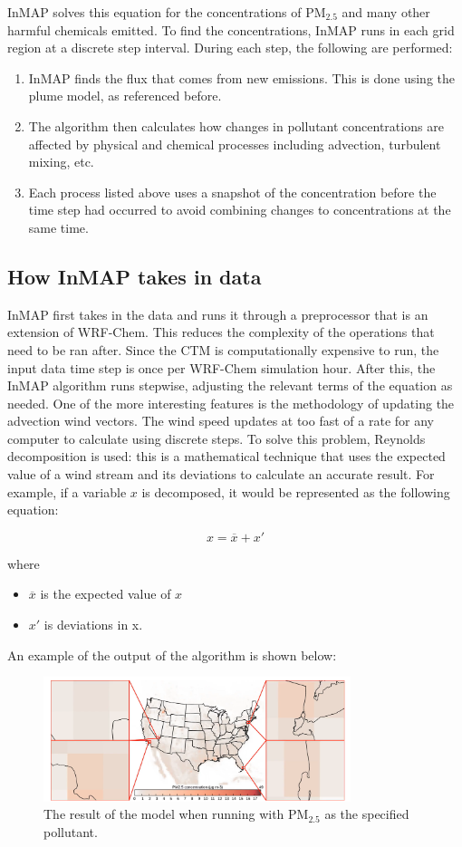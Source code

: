 \documentclass{article}
\begin{document}
InMAP solves this equation for the concentrations of $\text{PM}_{2.5}$ and many other harmful chemicals emitted. To find the concentrations,
InMAP runs in each grid region at a discrete step interval. During each step, the following are performed: 

\begin{enumerate}
    \item InMAP finds the flux that comes from new emissions. This is done using the plume model, as referenced before. 
    \item The algorithm then calculates how changes in pollutant concentrations are affected by physical and chemical processes including advection, turbulent mixing, etc.
    \item Each process listed above uses a snapshot of the concentration before the time step had occurred to avoid combining changes to concentrations at the same time. 
  \end{enumerate} 

\subsection{How InMAP takes in data}

InMAP first takes in the data and runs it through a preprocessor that is an extension of WRF-Chem. This reduces the complexity of the operations
that need to be ran after. Since the CTM is computationally expensive to run, the input data time step is once per WRF-Chem simulation hour. 
After this, the InMAP algorithm runs stepwise, adjusting the relevant terms of the equation as needed. One of the more interesting features is the 
methodology of updating the advection wind vectors. The wind speed updates at too fast of a rate for any computer to calculate using discrete steps.
To solve this problem, Reynolds decomposition is used: this is a mathematical technique that uses the expected value
of a wind stream and its deviations to calculate an accurate result. For example, if a variable $x$ is decomposed, it would be 
represented as the following equation: 

\begin{equation}
    x = \overline{x} + x'
\end{equation}

where

\begin{itemize}
    \item $\overline{x}$ is the expected value of $x$
    \item $x'$ is deviations in x.
\end{itemize}

An example of the output of the algorithm is shown below:


\begin{figure}[h]
    \centering
    \includegraphics[width=0.8\textwidth]{inmap2.png}
    \caption{The result of the model when running with $\text{PM}_{2.5}$ as the specified pollutant.}
    \label{fig:grid2}
 \end{figure}
\end{document}
